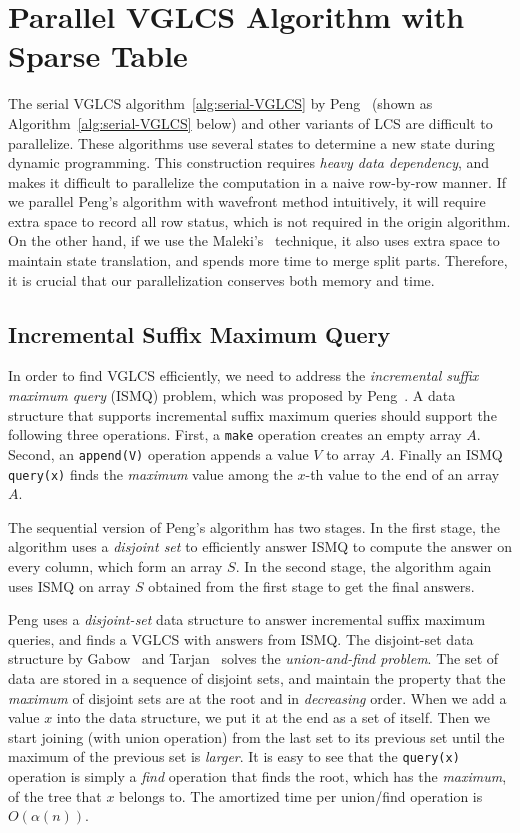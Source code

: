 \section{Parallel VGLCS Algorithm with Sparse Table} %
\label{sec:parallelVGLCS}

The serial VGLCS algorithm~\ref{alg:serial-VGLCS} by
Peng~\cite{Peng2011TheLC} (shown as Algorithm~\ref{alg:serial-VGLCS}
below) and other variants of LCS are difficult to parallelize.  These
algorithms use several states to determine a new state during dynamic
programming.  This construction requires {\em heavy data dependency},
and makes it difficult to parallelize the computation in a naive
row-by-row manner.  If we parallel Peng's algorithm with wavefront
method intuitively, it will require extra space to record all row
status, which is not required in the origin algorithm.  On the other
hand, if we use the Maleki's~\cite{Maleki2016EfficientPU} technique,
it also uses extra space to maintain state translation, and spends
more time to merge split parts.  Therefore, it is crucial that our
parallelization conserves both memory and time.



\subsection{Incremental Suffix Maximum Query}

In order to find VGLCS efficiently, we need to address the {\em
  incremental suffix maximum query} (ISMQ) problem, which was
proposed by Peng~\cite{Peng2011TheLC}.  A data structure that supports
incremental suffix maximum queries should support the following three
operations.  First, a {\tt make} operation creates an empty array $A$.
Second, an {\tt append(V)} operation appends a value $V$ to array $A$.
Finally an ISMQ {\tt query(x)} finds the {\em maximum} value among the
$x$-th value to the end of an array $A$.

The sequential version of Peng's algorithm has two stages.  In the
first stage, the algorithm uses a {\em disjoint set} to efficiently
answer ISMQ to compute the answer on every column, which form an array
$S$.  In the second stage, the algorithm again uses ISMQ on array $S$
obtained from the first stage to get the final answers.

Peng uses a {\em disjoint-set} data structure to answer incremental
suffix maximum queries, and finds a VGLCS with answers from ISMQ. The
disjoint-set data structure by Gabow~\cite{Gabow1983ALA} and
Tarjan~\cite{Tarjan1975EfficiencyOA} solves the {\em union-and-find
  problem}.  The set of data are stored in a sequence of disjoint
sets, and maintain the property that the {\em maximum} of disjoint
sets are at the root and in {\em decreasing} order.  When we add a
value $x$ into the data structure, we put it at the end as a set of
itself.  Then we start joining (with union operation) from the last
set to its previous set until the maximum of the previous set is {\em
  larger}.  It is easy to see that the {\tt query(x)} operation is
simply a {\em find} operation that finds the root, which has the {\em
  maximum}, of the tree that $x$ belongs to.  The amortized time per
union/find operation is $O(\alpha(n))$.

